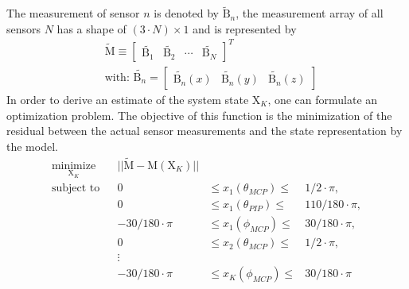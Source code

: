 The measurement of sensor $ n $ is denoted by $ \tilde{\mathrm{B}}_{n} $, the measurement array of all sensors $ N $ has a shape of $ (3 \cdot N) \times 1 $ and is represented by
\begin{equation}
\begin{aligned}
& \tilde{\mathrm{M}} \equiv \begin{bmatrix} \tilde{\mathrm{B}_{1}} & \tilde{\mathrm{B}_{2}} & \cdots & \tilde{\mathrm{B}_{N}} \end{bmatrix}^{T}\\
& \text{with: }  \tilde{\mathrm{B}_{n}} = \begin{bmatrix} \tilde{\mathrm{B}_{n}}(x) & \tilde{\mathrm{B}_{n}}(y) & \tilde{\mathrm{B}_{n}}(z) \end{bmatrix}
\end{aligned}
\end{equation}
In order to derive an estimate of the system state $ \mathrm{X}_K $, one can formulate an optimization problem. The objective of this function is the minimization of the residual between the actual sensor measurements and the state representation by the model.
\begin{equation} \label{eq:minimization}
\begin{aligned}
\underset{\mathrm{X}_K}{\text{minimize}} & & || \tilde{\mathrm{M}} - \mathrm{M}(\mathrm{X}_K) ||\\
\text{subject to} & & 0 & \leq {x}_1(\theta_{MCP}) \leq & 1/2 \cdot \pi, \\
				  & & 0 & \leq {x}_1(\theta_{PIP})  \leq & 110/180 \cdot \pi, \\
				  & & -30/180 \cdot \pi & \leq {x}_1(\phi_{MCP}) \leq & 30/180 \cdot \pi, \\
				  & & 0 & \leq {x}_2(\theta_{MCP})  \leq & 1/2 \cdot \pi, \\
				  & & \vdots \\
				  & & -30/180 \cdot \pi & \leq {x}_K(\phi_{MCP}) \leq & 30/180 \cdot \pi
\end{aligned}
\end{equation}
